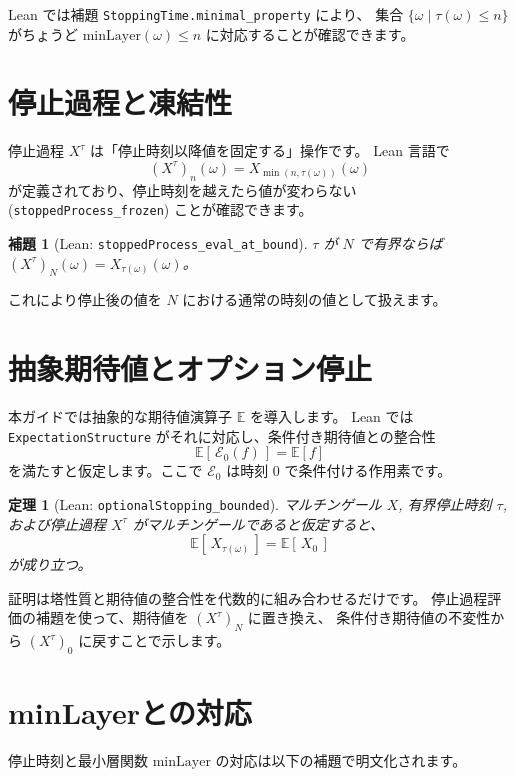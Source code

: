 \documentclass[12pt]{ltjsarticle}
\theoremstyle{definition}
\theoremstyle{plain}
\newtheorem{theorem}[definition]{定理}
\newtheorem{lemma}[definition]{補題}
\begin{document}
Lean では補題 \texttt{StoppingTime.minimal\_property} により、
集合 $\{\omega \mid \tau(\omega) \le n\}$ がちょうど $\mathrm{minLayer}(\omega)\le n$ に対応することが確認できます。

\section{停止過程と凍結性}

停止過程 $X^\tau$ は「停止時刻以降値を固定する」操作です。
Lean 言語で
\[
  (X^\tau)_n(\omega) = X_{\min(n,\tau(\omega))}(\omega)
\]
が定義されており、停止時刻を越えたら値が変わらない (\texttt{stoppedProcess\_frozen}) ことが確認できます。

\begin{lemma}[Lean: \texttt{stoppedProcess\_eval\_at\_bound}]
$\tau$ が $N$ で有界ならば $(X^\tau)_N(\omega)=X_{\tau(\omega)}(\omega)$。
\end{lemma}

これにより停止後の値を $N$ における通常の時刻の値として扱えます。

\section{抽象期待値とオプション停止}

本ガイドでは抽象的な期待値演算子 $\mathbb{E}$ を導入します。
Lean では \texttt{ExpectationStructure} がそれに対応し、条件付き期待値との整合性
\[
  \mathbb{E}[\,\mathcal{E}_0(f)\,] = \mathbb{E}[f]
\]
を満たすと仮定します。ここで $\mathcal{E}_0$ は時刻 0 で条件付ける作用素です。

\begin{theorem}[Lean: \texttt{optionalStopping\_bounded}]
マルチンゲール $X$, 有界停止時刻 $\tau$, および停止過程 $X^\tau$ がマルチンゲールであると仮定すると、
\[
  \mathbb{E}[\,X_{\tau(\omega)}\,] = \mathbb{E}[\,X_0\,]
\]
が成り立つ。
\end{theorem}

証明は塔性質と期待値の整合性を代数的に組み合わせるだけです。
停止過程評価の補題を使って、期待値を $(X^\tau)_N$ に置き換え、
条件付き期待値の不変性から $(X^\tau)_0$ に戻すことで示します。

\section{minLayerとの対応}

停止時刻と最小層関数 $\mathrm{minLayer}$ の対応は以下の補題で明文化されます。
\end{document}
